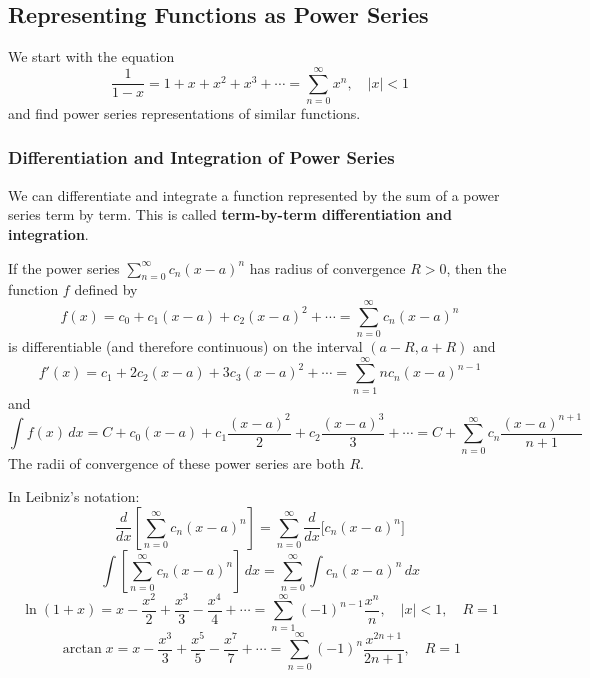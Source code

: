 \subsection{Representing Functions as Power Series}

We start with the equation
\[\frac{1}{1-x}=1+x+x^2+x^3+\cdots=\sum_{n=0}^\infty x^n,\quad|x|<1\]
and find power series representations of similar functions.

\subsubsection*{Differentiation and Integration of Power Series}

We can differentiate and integrate a function represented by the sum of a
power series term by term.
This is called \textbf{term-by-term differentiation and integration}.
\begin{theorem}
    If the power series \(\displaystyle{\sum_{n=0}^\infty c_n(x-a)^n}\) has radius of convergence \(R>0\),
    then the function \(f\) defined by
    \[f(x)=c_0+c_1(x-a)+c_2(x-a)^2+\cdots=\sum_{n=0}^\infty c_n(x-a)^n\]
    is differentiable (and therefore continuous) on the interval
    \((a-R,a+R)\) and
    \[f'(x)=c_1+2c_2(x-a)+3c_3(x-a)^2+\cdots
    =\sum_{n=1}^\infty nc_n(x-a)^{n-1}\]
    and
    \[\int f(x)\,dx
    =C+c_0(x-a)+c_1\frac{(x-a)^2}{2}+c_2\frac{(x-a)^3}{3}+\cdots
    =C+\sum_{n=0}^\infty c_n\frac{(x-a)^{n+1}}{n+1}\]
    The radii of convergence of these power series are both \(R\).
\end{theorem}
In Leibniz's notation:
\[\frac{d}{dx}\left[\sum_{n=0}^\infty c_n(x-a)^n\right]
=\sum_{n=0}^\infty\frac{d}{dx}\big[c_n(x-a)^n\big]\]
\[\int\left[\sum_{n=0}^\infty c_n(x-a)^n\right]\,dx
=\sum_{n=0}^\infty\int c_n(x-a)^n\,dx\]
\[\ln(1+x)=x-\frac{x^2}{2}+\frac{x^3}{3}-\frac{x^4}{4}+\cdots
=\sum_{n=1}^\infty(-1)^{n-1}\frac{x^n}{n},\quad|x|<1,\quad R=1\]
\[\arctan x=x-\frac{x^3}{3}+\frac{x^5}{5}-\frac{x^7}{7}+\cdots
=\sum_{n=0}^\infty(-1)^n\frac{x^{2n+1}}{2n+1},\quad R=1\]